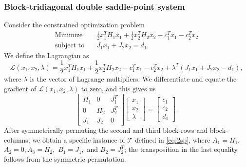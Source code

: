 \documentclass{article}
\begin{document}
\subsubsection*{Block-tridiagonal double saddle-point system}
Consider the constrained optimization problem
\begin{align*}
\text{Minimize} \quad & \frac{1}{2} x_1^T H_1 x_1 + \frac{1}{2} x_2^T H_2 x_2 - c_1^T x_1 - c_2^T x_2 \\
\text{subject to} \quad & J_1 x_1 +J_2 x_2 = d_1.
\end{align*}
We define the Lagrangian as
$$ \mathcal{L}(x_1,x_2,\lambda) = \frac{1}{2} x_1^T H_1 x_1 + \frac12 x_2^T H_2 x_2  -c_1^T x_1 - c_2^T x_2 + \lambda^T (J_1x_1 +J_2x_2 -d_1),$$
where $\lambda$ is the vector of Lagrange multipliers.
We differentiate and equate the gradient of $\mathcal{L}(x_1,x_2,\lambda)$ to zero, and this gives us
\begin{equation}
\label{eq:opt}
\begin{bmatrix}
H_1 & 0 & J_1^T  \\
0 & H_2 & J_2^T \\
J_1 & J_2 & 0
\end{bmatrix}\begin{bmatrix}
    x_1 \\
    x_2 \\
    \lambda
\end{bmatrix} = \begin{bmatrix}
    c_1 \\
    c_2 \\
    d_1
\end{bmatrix}.
\end{equation}
After symmetrically permuting the second and third block-rows and block-columns, we obtain a specific instance of $\mathcal{T}$ defined in \eqref{eq:2sp}, where $A_1=H_1$, $A_2=0, A_3=H_2,$ $B_1=J_1,$ and $B_2=J_2^T$; the transposition in the last equality follows from the symmetric permutation.

\end{document}
